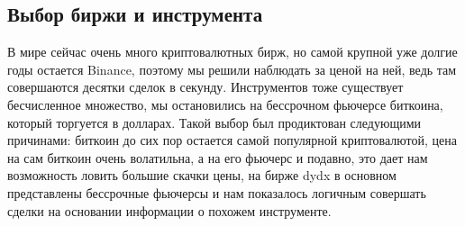 \subsection{Выбор биржи и инструмента}
В мире сейчас очень много криптовалютных бирж, но самой крупной уже долгие годы остается Binance, поэтому мы решили наблюдать за ценой на ней, ведь там совершаются десятки сделок в секунду. Инструментов тоже существует бесчисленное множество, мы остановились на бессрочном фьючерсе биткоина, который торгуется в долларах. Такой выбор был продиктован следующими причинами: биткоин до сих пор остается самой популярной криптовалютой, цена на сам биткоин очень волатильна, а на его фьючерс и подавно, это дает нам возможность ловить большие скачки цены, на бирже dydx в основном представлены бессрочные фьючерсы и нам показалось логичным совершать сделки на основании информации о похожем инструменте.  


